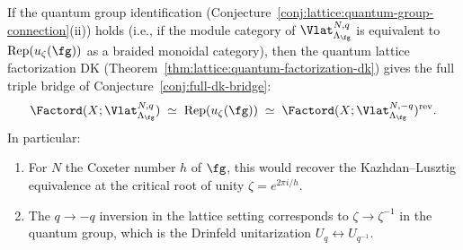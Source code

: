 \begin{conjecture}
\label{conj:lattice:dk5-quantum-bridge}
If the quantum group identification
\textup{(}Conjecture~\textup{\ref{conj:lattice:quantum-group-connection}(ii))}
holds (i.e., if the module category of
$\Vlat_{\Lambda_\fg}^{N,q}$ is equivalent to
$\operatorname{Rep}(u_\zeta(\fg))$ as a braided monoidal category),
then the quantum lattice factorization DK
\textup{(}Theorem~\textup{\ref{thm:lattice:quantum-factorization-dk})}
gives the full triple bridge of
Conjecture~\textup{\ref{conj:full-dk-bridge}}:
\begin{equation}\label{eq:lattice:triple-bridge}
\Factord(X; \Vlat_{\Lambda_\fg}^{N,q})
\;\simeq\;
\operatorname{Rep}(u_\zeta(\fg))
\;\simeq\;
\Factord(X; \Vlat_{\Lambda_\fg}^{N,-q})^{\mathrm{rev}}.
\end{equation}
In particular:
\begin{enumerate}[label=(\roman*)]
\item For $N$ the Coxeter number $h$ of $\fg$, this would
 recover the Kazhdan--Lusztig equivalence at the critical root of
 unity $\zeta = e^{2\pi i/h}$.
\item The $q \to -q$ inversion in the lattice setting corresponds
 to $\zeta \to \zeta^{-1}$ in the quantum group, which is the
 Drinfeld unitarization $U_q \leftrightarrow U_{q^{-1}}$.
\end{enumerate}
\end{conjecture}

